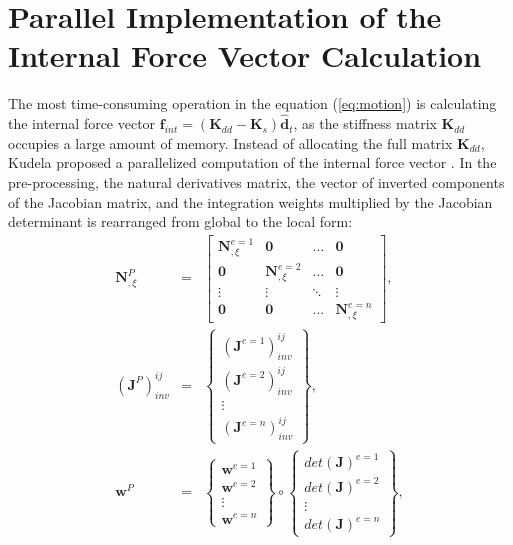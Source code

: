 \section{Parallel Implementation of the Internal Force Vector Calculation}
\label{sec:gpu}


The most time-consuming operation in the equation (\ref{eq:motion}) is calculating the internal force vector \(\textbf{f}_{int}=\left(\textbf{K}_{dd}-\textbf{K}_{s}\right)\widehat{\textbf{d}}_{t}\), as the stiffness matrix \(\textbf{K}_{dd}\) occupies a large amount of memory.
Instead of allocating the full matrix \(\textbf{K}_{dd}\), Kudela proposed a parallelized computation of the internal force vector \cite{kudela2016parallel}.
In the pre-processing, the natural derivatives matrix, the vector of inverted components of the Jacobian matrix, and the integration weights multiplied by the Jacobian determinant is rearranged from global to the local form:
\begin{eqnarray}
	\label{eq:isoparametric}
	\textbf{N}^P_{,\xi} & = & \left[ \begin{array}{cccc}
		\textbf{N}^{e=1}_{,\xi} & \textbf{0} & \ldots & \textbf{0}\\
		\textbf{0} & \textbf{N}^{e=2}_{,\xi} & \ldots & \textbf{0}\\
		\vdots & \vdots &  \ddots & \vdots\\
		\textbf{0} & \textbf{0} & \ldots & \textbf{N}^{e=n}_{,\xi}
	\end{array}\right],\\
	\label{eq:jacob}
	\left(\textbf{J}^P\right)^{ij}_{inv} & = & \left\{ \begin{array}{c}
		\left(\textbf{J}^{e=1}\right)^{ij}_{inv}\\
		\left(\textbf{J}^{e=2}\right)^{ij}_{inv}\\
		\vdots\\
		\left(\textbf{J}^{e=n}\right)^{ij}_{inv} \end{array}\right\},\\
	\label{eq:intWeights}
	\textbf{w}^P & = & \left\{ \begin{array}{c}
		\textbf{w}^{e=1}\\
		\textbf{w}^{e=2}\\
		\vdots\\
		\textbf{w}^{e=n} \end{array}\right\} \circ
	\left\{ \begin{array}{c}
		det(\textbf{J})^{e=1}\\
		det(\textbf{J})^{e=2}\\
		\vdots\\
		det(\textbf{J})^{e=n} \end{array}\right\},
\end{eqnarray}
